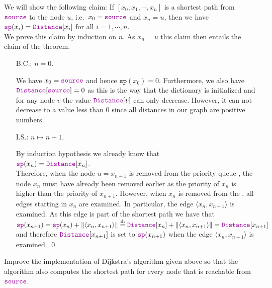 \proof
We will show the following claim:  If $[x_0, x_1, \cdots, x_n]$ is a shortest path from $\mytt{source}$
to the node $u$, i.e.~$x_0 = \mytt{source}$ and $x_n = u$, then we have
\\[0.2cm]
\hspace*{1.3cm}
$\mytt{sp}(x_i) = \mytt{Distance}[x_i]$ \quad for all $i = 1, \cdots, n$.
\\[0.2cm]
We prove this claim by induction on $n$.  As $x_n = u$ this claim then entails the claim of the theorem.
\begin{enumerate}
\item[B.C.:] $n = 0$.

  We have $x_0 = \mytt{source}$ and hence $\mathtt{sp}(x_0) = 0$.
  Furthermore, we also have $\mytt{Distance}[\mytt{source}] = 0$ as this is the way that the dictionary
   is initialized and for any node $v$ the value $\mytt{Distance}[v]$ can only decrease.
  However, it can not decrease to a value less than $0$ since all distances in our
  graph are positive numbers. 
\item[I.S.:] $n \mapsto n+1$.

  By induction hypothesis we already know that
  \\[0.2cm]
  \hspace*{1.3cm}
  $\mytt{sp}(x_n) = \mytt{Distance}[x_n]$.
  \\[0.2cm]
  Therefore, when the node $u = x_{n+1}$ is removed from the priority queue , the node
  $x_n$ must have already been removed earlier as the priority of $x_n$ is higher than the priority of
  $x_{n+1}$.  However, when $x_n$ is removed from the , all edges starting in $x_n$ are examined.  In
  particular, the edge $\langle x_n, x_{n+1} \rangle$ is examined.  As this edge is part of the shortest path
  we have that
  \\[0.2cm]
  \hspace*{0.8cm}
  $\mytt{sp}(x_{n+1}) = \mytt{sp}(x_n) + \weight{\langle x_n, x_{n+1} \rangle} \stackrel{\mathrm{ih}}{=}
    \mytt{Distance}[x_n] + \weight{\langle x_n, x_{n+1} \rangle} = \mytt{Distance}[x_{n+1}]$
  \\[0.2cm]
  and therefore $\mytt{Distance}[x_{n+1}]$ is set to $\mytt{sp}(x_{n+1})$ when the edge $\langle x_n, x_{n+1}
  \rangle$ is examined. \qed
\end{enumerate}


\exercise
Improve the implementation of Dijkstra's algorithm given above so that the algorithm also computes
the shortest path for every node that is reachable from $\mytt{source}$.
\eox


